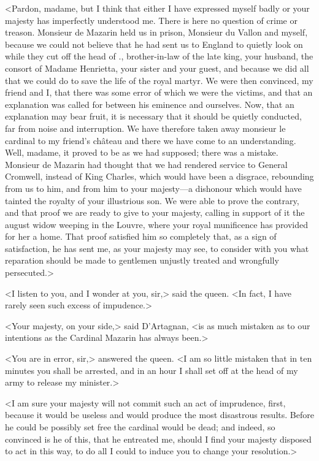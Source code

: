 <Pardon, madame, but I think that either I have expressed myself badly or your majesty has imperfectly understood me. There is here no question of crime or treason. Monsieur de Mazarin held us in prison, Monsieur du Vallon and myself, because we could not believe that he had sent us to England to quietly look on while they cut off the head of ., brother-in-law of the late king, your husband, the consort of Madame Henrietta, your sister and your guest, and because we did all that we could do to save the life of the royal martyr. We were then convinced, my friend and I, that there was some error of which we were the victims, and that an explanation was called for between his eminence and ourselves. Now, that an explanation may bear fruit, it is necessary that it should be quietly conducted, far from noise and interruption. We have therefore taken away monsieur le cardinal to my friend's château and there we have come to an understanding. Well, madame, it proved to be as we had supposed; there was a mistake. Monsieur de Mazarin had thought that we had rendered service to General Cromwell, instead of King Charles, which would have been a disgrace, rebounding from us to him, and from him to your majesty—a dishonour which would have tainted the royalty of your illustrious son. We were able to prove the contrary, and that proof we are ready to give to your majesty, calling in support of it the august widow weeping in the Louvre, where your royal munificence has provided for her a home. That proof satisfied him so completely that, as a sign of satisfaction, he has sent me, as your majesty may see, to consider with you what reparation should be made to gentlemen unjustly treated and wrongfully persecuted.>

<I listen to you, and I wonder at you, sir,> said the queen. <In fact, I have rarely seen such excess of impudence.>

<Your majesty, on your side,> said D'Artagnan, <is as much mistaken as to our intentions as the Cardinal Mazarin has always been.>

<You are in error, sir,> answered the queen. <I am so little mistaken that in ten minutes you shall be arrested, and in an hour I shall set off at the head of my army to release my minister.>

<I am sure your majesty will not commit such an act of imprudence, first, because it would be useless and would produce the most disastrous results. Before he could be possibly set free the cardinal would be dead; and indeed, so convinced is he of this, that he entreated me, should I find your majesty disposed to act in this way, to do all I could to induce you to change your resolution.>

